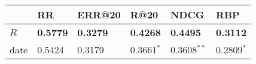 \begin{tabular}{llllll}
\toprule
{} &               RR &           ERR@20 &             R@20 &             NDCG &              RBP \\
\midrule
$R$  &  \textbf{0.5779} &  \textbf{0.3279} &  \textbf{0.4268} &  \textbf{0.4495} &  \textbf{0.3112} \\
date &           0.5424 &           0.3179 &     0.3661$^{*}$ &    0.3608$^{**}$ &     0.2809$^{*}$ \\
\bottomrule
\end{tabular}
